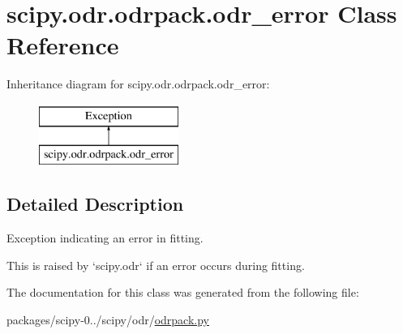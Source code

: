 \hypertarget{classscipy_1_1odr_1_1odrpack_1_1odr__error}{}\section{scipy.\+odr.\+odrpack.\+odr\+\_\+error Class Reference}
\label{classscipy_1_1odr_1_1odrpack_1_1odr__error}
Inheritance diagram for scipy.\+odr.\+odrpack.\+odr\+\_\+error\+:\begin{figure}[H]
\begin{center}
\leavevmode
\includegraphics[height=2.000000cm]{classscipy_1_1odr_1_1odrpack_1_1odr__error}
\end{center}
\end{figure}


\subsection{Detailed Description}
\begin{DoxyVerb}Exception indicating an error in fitting.

This is raised by `scipy.odr` if an error occurs during fitting.
\end{DoxyVerb}
 

The documentation for this class was generated from the following file\+:\begin{DoxyCompactItemize}
\item 
packages/scipy-\/0../scipy/odr/\hyperlink{odrpack_8py}{odrpack.\+py}\end{DoxyCompactItemize}
